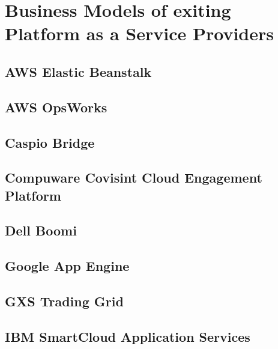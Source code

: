 \chapter{Business Models of exiting Platform as a Service Providers}\label{ch:app01}

\section{AWS Elastic Beanstalk}


\newpage
\section{AWS OpsWorks}


\section{Caspio Bridge}


\newpage
\section{Compuware Covisint Cloud Engagement Platform}


\newpage
\section{Dell Boomi}


\section{Google App Engine}


\section{GXS Trading Grid}\label{ch:app01:gxs}


\newpage
\section{IBM SmartCloud Application Services}


